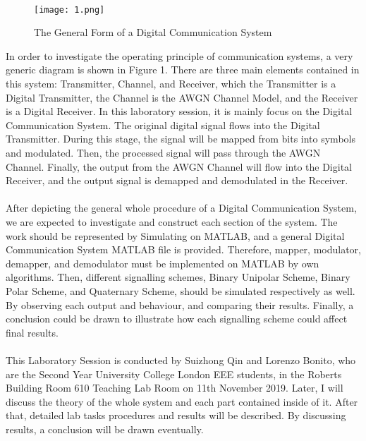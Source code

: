 \documentclass[12pt]{article}
\begin{document}
    \paragraph{}
    \begin{figure}[H]
    \centering
    \texttt{[image: 1.png]}
    \caption{The General Form of a Digital Communication System}
    \end{figure}
    In order to investigate the operating principle of communication systems, a very generic diagram is shown in Figure 1. There are three main elements contained in this system: Transmitter, Channel, and Receiver, which the Transmitter is a Digital Transmitter, the Channel is the AWGN Channel Model, and the Receiver is a Digital Receiver. In this laboratory session, it is mainly focus on the Digital Communication System. The original digital signal flows into the Digital Transmitter. During this stage, the signal will be mapped from bits into symbols and modulated. Then, the processed signal will pass through the AWGN Channel. Finally, the output from the AWGN Channel will flow into the Digital Receiver, and the output signal is demapped and demodulated in the Receiver.
    
    \paragraph{}
    After depicting the general whole procedure of a Digital Communication System, we are expected to investigate and construct each section of the system. The work should be represented by Simulating on MATLAB, and a general Digital Communication System MATLAB file is provided. Therefore, mapper, modulator, demapper, and demodulator must be implemented on MATLAB by own algorithms. Then, different signalling schemes, Binary Unipolar Scheme, Binary Polar Scheme, and Quaternary Scheme, should be simulated respectively as well. By observing each output and behaviour, and comparing their results. Finally, a conclusion could be drawn to illustrate how each signalling scheme could affect final results.
    
    \paragraph{}
    This Laboratory Session is conducted by Suizhong Qin and Lorenzo Bonito, who are the Second Year University College London EEE students, in the Roberts Building Room 610 Teaching Lab Room on 11th November 2019. Later, I will discuss the theory of the whole system and each part contained inside of it. After that, detailed lab tasks procedures and results will be described. By discussing results, a conclusion will be drawn eventually.
    
\end{document}
